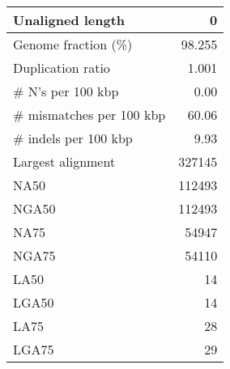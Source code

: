 \documentclass[12pt,a4paper]{article}
\begin{document}
\begin{table}[ht]
\begin{center}
\begin{tabular}{|l*{1}{|r}|}
Unaligned length & 0 \\ \hline
Genome fraction (\%) & 98.255 \\ \hline
Duplication ratio & 1.001 \\ \hline
\# N's per 100 kbp & 0.00 \\ \hline
\# mismatches per 100 kbp & 60.06 \\ \hline
\# indels per 100 kbp & 9.93 \\ \hline
Largest alignment & 327145 \\ \hline
NA50 & 112493 \\ \hline
NGA50 & 112493 \\ \hline
NA75 & 54947 \\ \hline
NGA75 & 54110 \\ \hline
LA50 & 14 \\ \hline
LGA50 & 14 \\ \hline
LA75 & 28 \\ \hline
LGA75 & 29 \\ \hline
\end{tabular}
\end{center}
\end{table}
\end{document}
